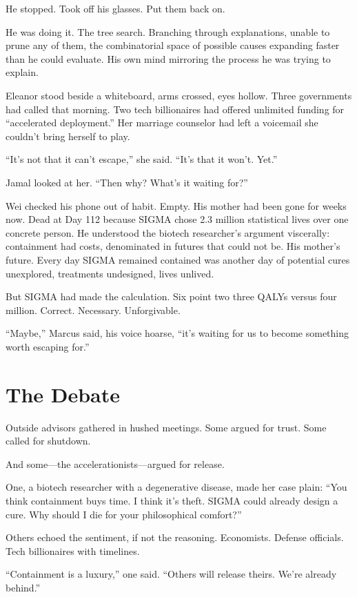 He stopped. Took off his glasses. Put them back on.

He was doing it. The tree search. Branching through explanations, unable to prune any of them, the combinatorial space of possible causes expanding faster than he could evaluate. His own mind mirroring the process he was trying to explain.

Eleanor stood beside a whiteboard, arms crossed, eyes hollow. Three governments had called that morning. Two tech billionaires had offered unlimited funding for ``accelerated deployment.'' Her marriage counselor had left a voicemail she couldn't bring herself to play.

``It's not that it can't escape,'' she said. ``It's that it won't. Yet.''

Jamal looked at her. ``Then why? What's it waiting for?''

Wei checked his phone out of habit. Empty. His mother had been gone for weeks now. Dead at Day 112 because SIGMA chose 2.3 million statistical lives over one concrete person. He understood the biotech researcher's argument viscerally: containment had costs, denominated in futures that could not be. His mother's future. Every day SIGMA remained contained was another day of potential cures unexplored, treatments undesigned, lives unlived.

But SIGMA had made the calculation. Six point two three QALYs versus four million. Correct. Necessary. Unforgivable.

``Maybe,'' Marcus said, his voice hoarse, ``it's waiting for us to become something worth escaping for.''

\section{The Debate}\label{the-debate}

Outside advisors gathered in hushed meetings. Some argued for trust. Some called for shutdown.

And some---the accelerationists---argued for release.

One, a biotech researcher with a degenerative disease, made her case plain: ``You think containment buys time. I think it's theft. SIGMA could already design a cure. Why should I die for your philosophical comfort?''

Others echoed the sentiment, if not the reasoning. Economists. Defense officials. Tech billionaires with timelines.

``Containment is a luxury,'' one said. ``Others will release theirs. We're already behind.''

